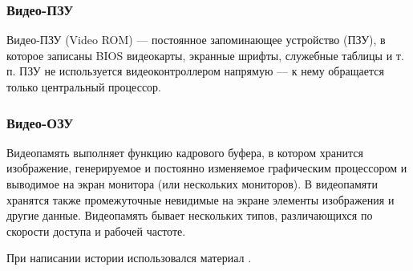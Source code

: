 \subsubsection{Видео-ПЗУ}

Видео-ПЗУ (Video ROM) — постоянное запоминающее устройство (ПЗУ), в которое записаны BIOS видеокарты, экранные шрифты, служебные таблицы и т. п. ПЗУ не используется видеоконтроллером напрямую — к нему обращается только центральный процессор.

\subsubsection{Видео-ОЗУ}

Видеопамять выполняет функцию кадрового буфера, в котором хранится изображение, генерируемое и постоянно изменяемое графическим процессором и выводимое на экран монитора (или нескольких мониторов). В видеопамяти хранятся также промежуточные невидимые на экране элементы изображения и другие данные. Видеопамять бывает нескольких типов, различающихся по скорости доступа и рабочей частоте.

При написании истории использовался материал \cite{hist1}.
